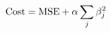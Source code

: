 \documentclass[preview]{standalone}
\begin{document}
\begin{align*}
\special{dvisvgm:raw <g id='unique000'>}\text{Cost} = \text{MSE} + \alpha \sum_j \beta_j^2\special{dvisvgm:raw </g>}
\end{align*}
\end{document}
